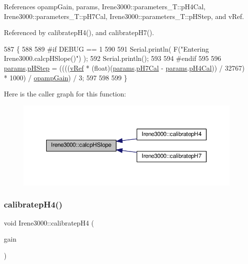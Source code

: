 References opamp\+Gain, params, Irene3000\+::parameters\+\_\+\+T\+::p\+H4\+Cal, Irene3000\+::parameters\+\_\+\+T\+::p\+H7\+Cal, Irene3000\+::parameters\+\_\+\+T\+::p\+H\+Step, and v\+Ref.



Referenced by calibratep\+H4(), and calibratep\+H7().


\begin{DoxyCode}
587 \{
588 
589 \textcolor{preprocessor}{#if DEBUG == 1 }
590 
591     Serial.println( F(\textcolor{stringliteral}{"Entering Irene3000.calcpHSlope()"}) );
592     Serial.println();
593 
594 \textcolor{preprocessor}{#endif }
595 
596     \hyperlink{classIrene3000_a136585a5ee7f9ac6ab52175fa153f8e3}{params}.\hyperlink{structIrene3000_1_1parameters__T_a61cfcc2539d5f630e9071f3753aba9fe}{pHStep} = ((((\hyperlink{classIrene3000_a018e7ff9bee57e6d2b298667a668ba7e}{vRef} * (float)(\hyperlink{classIrene3000_a136585a5ee7f9ac6ab52175fa153f8e3}{params}.\hyperlink{structIrene3000_1_1parameters__T_a21265466a570d84bff914f26d2f7a03e}{pH7Cal} - 
      \hyperlink{classIrene3000_a136585a5ee7f9ac6ab52175fa153f8e3}{params}.\hyperlink{structIrene3000_1_1parameters__T_a1144de6fb54eb3e1dd2a3d8c2afc97dc}{pH4Cal})) / 32767) * 1000) / \hyperlink{classIrene3000_a4e588985ca74e5076029d5dee81034f2}{opampGain}) / 3;
597 
598  
599 \}
\end{DoxyCode}
Here is the caller graph for this function\+:
\nopagebreak
\begin{figure}[H]
\begin{center}
\leavevmode
\includegraphics[width=350pt]{classIrene3000_a81f6a79e546679692053f7ac1af49613_icgraph}
\end{center}
\end{figure}
\mbox{\label{classIrene3000_a9772eeea2305fad6236a82e33e93892e}} 
\subsubsection{\texorpdfstring{calibratep\+H4()}{calibratepH4()}}
{\footnotesize\ttfamily void Irene3000\+::calibratep\+H4 (\begin{DoxyParamCaption}\item[{ads\+Gain\+\_\+t}]{gain }\end{DoxyParamCaption})}

